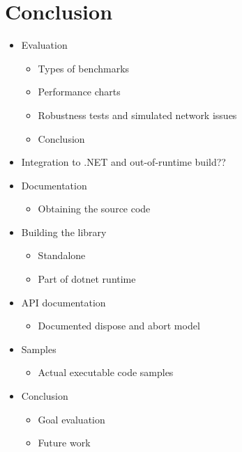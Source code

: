 \chapter*{Conclusion}

\begin{itemize}

    \item Evaluation
    \begin{itemize}

        \item Types of benchmarks
        \item Performance charts
        \item Robustness tests and simulated network issues
        \item Conclusion

    \end{itemize}

    \item Integration to .NET and out-of-runtime build??

    \item Documentation
        \begin{itemize}

            \item Obtaining the source code

        \end{itemize}

        \item Building the library
        \begin{itemize}

            \item Standalone
            \item Part of dotnet runtime

        \end{itemize}

        \item API documentation
        \begin{itemize}

            \item Documented dispose and abort model

        \end{itemize}

        \item Samples
        \begin{itemize}

            \item Actual executable code samples

        \end{itemize}

    \item Conclusion
    \begin{itemize}

        \item Goal evaluation
        \item Future work

    \end{itemize}

\end{itemize}
